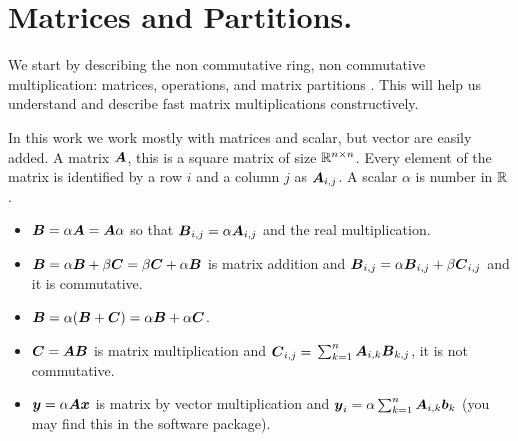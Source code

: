\documentclass[acmsmall]{acmart}
\begin{document}
\section{Matrices and Partitions.}
\label{sec:matrices}
We start by describing the non commutative ring, non commutative
multiplication: matrices, operations, and matrix partitions . This
will help us understand and describe fast matrix multiplications
constructively.

In this work we work mostly with matrices and scalar, but vector are
easily added. A matrix ${\boldsymbol A}$, this is a square matrix of size
$\mathbb{R}^{n\times n}$. Every element of the matrix is identified by a row
$i$ and a column $j$ as ${\boldsymbol A}_{i,j}$. A scalar $\alpha$ is number in
$\mathbb{R}$.
\begin{itemize}
  \item ${\boldsymbol B} = \alpha{\boldsymbol A} = {\boldsymbol A}\alpha$ so that ${\boldsymbol B}_{i,j}
    = \alpha{\boldsymbol A}_{i,j}$ and the real multiplication.
  \item ${\boldsymbol B} = \alpha{\boldsymbol B} + \beta{\boldsymbol C}= \beta{\boldsymbol C} +
    \alpha{\boldsymbol B}$ is matrix addition and ${\boldsymbol B}_{i,j} =
    \alpha{\boldsymbol B}_{i,j} + \beta{\boldsymbol C}_{i,j}$ and it is commutative.
  \item ${\boldsymbol B} = \alpha({\boldsymbol B} + {\boldsymbol C}) = \alpha{\boldsymbol B} +
    \alpha{\boldsymbol C}$. 
  \item ${\boldsymbol C}= {\boldsymbol A}{\boldsymbol B}$ is matrix multiplication and ${\boldsymbol C}_{i,j}=$ 
    $\sum_{k=1}^n {\boldsymbol A}_{i,k}{\boldsymbol B}_{k,j}$, it is not commutative.
  \item ${\boldsymbol y}= \alpha{\boldsymbol A}{\boldsymbol x}$ is matrix by vector
    multiplication and ${\boldsymbol y}_{i}=\alpha \sum_{k=1}^n
    {\boldsymbol A}_{i,k}{\boldsymbol b}_{k}$ (you may find this in the software
    package).
\end{itemize}
\end{document}
